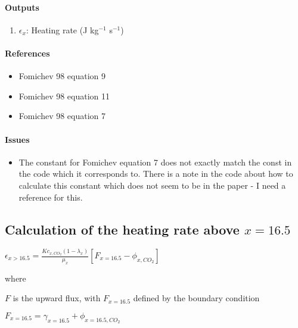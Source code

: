    \paragraph{Outputs}
   \begin{enumerate}
   \item $\epsilon_x$: Heating rate (J kg$^{-1}$ s$^{-1}$)
   \end{enumerate}

   \paragraph{References}
   \begin{itemize}
   \item Fomichev 98 equation 9
   \item Fomichev 98 equation 11
   \item Fomichev 98 equation 7
   \end{itemize}

   \paragraph{Issues}
   \begin{itemize}
   \item The constant for Fomichev equation 7 does not exactly match the 
     const in the code which it corresponds to. There is a note in the 
     code about how to calculate this constant which does not seem to be 
     in the paper - I need a reference for this.
   \end{itemize}

 
\subsection{Calculation of the heating rate above $x=16.5$}

   $\epsilon_{x>16.5} = \frac{K c_{x,CO_2}(1 - \lambda_x)}{\mu_x} [F_{x=16.5} - \phi_{x,CO_2}]$

   \noindent where

   \noindent $F$ is the upward flux, with $F_{x=16.5}$ defined by the boundary condition 

   \noindent $F_{x=16.5} = \gamma_{x=16.5} + \phi_{x=16.5,CO_2}$ 

